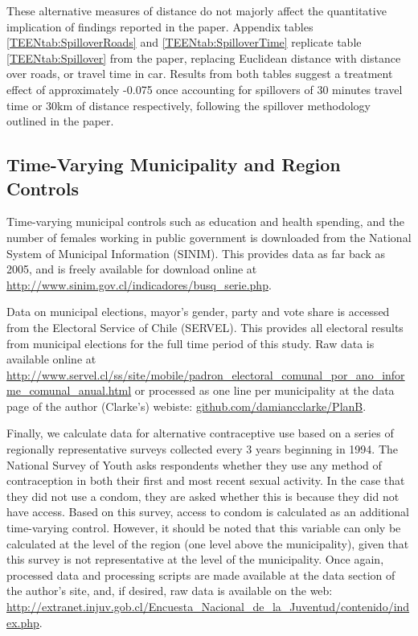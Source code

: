 \documentclass[11pt,subeqn]{article}
\begin{document}
\begin{spacing}{1.4}
These alternative measures of distance do not majorly affect the quantitative 
implication of findings reported in the paper.  Appendix tables 
\ref{TEENtab:SpilloverRoads} and  \ref{TEENtab:SpilloverTime} replicate table 
\ref{TEENtab:Spillover} from the paper, replacing Euclidean distance with 
distance over roads, or travel time in car. Results from both tables suggest 
a treatment effect of approximately -0.075 once accounting for spillovers of 
30 minutes travel time or 30km of distance respectively, following the 
spillover methodology outlined in the paper.

\clearpage
\subsection{Time-Varying Municipality and Region Controls}
Time-varying municipal controls such as education and health spending, and the
number of females working in public government is downloaded from the National
System of Municipal Information (SINIM).  This provides data as far back as
2005, and is freely available for download online at
\url{http://www.sinim.gov.cl/indicadores/busq_serie.php}.

Data on municipal elections, mayor's gender, party and vote share is accessed
from the Electoral Service of Chile (SERVEL).  This provides all electoral
results from municipal elections for the full time period of this study.  Raw
data is available online at 
\url{http://www.servel.cl/ss/site/mobile/padron_electoral_comunal_por_ano_informe_comunal_anual.html}
or processed as one line per municipality at the data page of the author
(Clarke's) webiste: \url{github.com/damiancclarke/PlanB}.

Finally, we calculate data for alternative contraceptive use based on
a series of regionally representative surveys collected every 3 years beginning
in 1994.  The National Survey of Youth asks respondents whether they use any 
method of contraception in both their first and most recent sexual activity.  
In the case that they did not use a condom, they are asked whether this is 
because they did not have access.  Based on this survey, access to condom is
calculated as an additional time-varying control.  However, it should be noted
that this variable can only be calculated at the level of the region (one 
level above the municipality), given that this survey is not representative at 
the level of the municipality.  Once again, processed data and processing 
scripts are made available at the data section of the author's site, and, if 
desired, raw data is available on the web: 
\url{http://extranet.injuv.gob.cl/Encuesta_Nacional_de_la_Juventud/contenido/index.php}.


\end{spacing}
\end{document}
